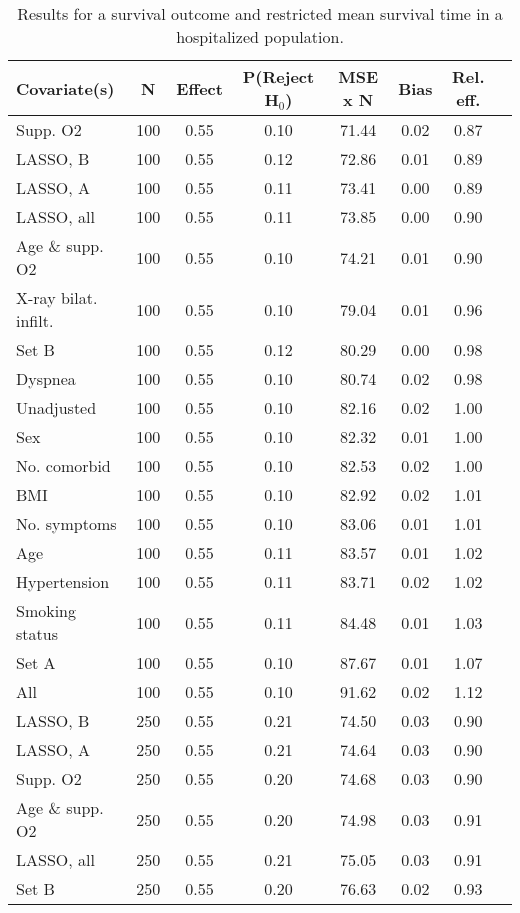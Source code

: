 \documentclass{article}
\begin{document}
{\tabcolsep=6pt  %
\begin{longtable}{lccccccc}
\caption{Results for a survival outcome and restricted mean survival time in a hospitalized population.}\label{tab2}\\
Covariate(s) & N & Effect & P(Reject H$_0$) & MSE x N & Bias & Rel. eff.\\ \midrule
Supp. O2 & 100 & 0.55 & 0.10 & 71.44 & 0.02 & 0.87\\
LASSO, B & 100 & 0.55 & 0.12 & 72.86 & 0.01 & 0.89\\
LASSO, A & 100 & 0.55 & 0.11 & 73.41 & 0.00 & 0.89\\
LASSO, all & 100 & 0.55 & 0.11 & 73.85 & 0.00 & 0.90\\
Age \& supp. O2 & 100 & 0.55 & 0.10 & 74.21 & 0.01 & 0.90\\
X-ray bilat. infilt. & 100 & 0.55 & 0.10 & 79.04 & 0.01 & 0.96\\
Set B & 100 & 0.55 & 0.12 & 80.29 & 0.00 & 0.98\\
Dyspnea & 100 & 0.55 & 0.10 & 80.74 & 0.02 & 0.98\\
Unadjusted & 100 & 0.55 & 0.10 & 82.16 & 0.02 & 1.00\\
Sex & 100 & 0.55 & 0.10 & 82.32 & 0.01 & 1.00\\
No. comorbid & 100 & 0.55 & 0.10 & 82.53 & 0.02 & 1.00\\
BMI & 100 & 0.55 & 0.10 & 82.92 & 0.02 & 1.01\\
No. symptoms & 100 & 0.55 & 0.10 & 83.06 & 0.01 & 1.01\\
Age & 100 & 0.55 & 0.11 & 83.57 & 0.01 & 1.02\\
Hypertension & 100 & 0.55 & 0.11 & 83.71 & 0.02 & 1.02\\
Smoking status & 100 & 0.55 & 0.11 & 84.48 & 0.01 & 1.03\\
Set A & 100 & 0.55 & 0.10 & 87.67 & 0.01 & 1.07\\
All & 100 & 0.55 & 0.10 & 91.62 & 0.02 & 1.12\\ \midrule
LASSO, B & 250 & 0.55 & 0.21 & 74.50 & 0.03 & 0.90\\
LASSO, A & 250 & 0.55 & 0.21 & 74.64 & 0.03 & 0.90\\
Supp. O2 & 250 & 0.55 & 0.20 & 74.68 & 0.03 & 0.90\\
Age \& supp. O2 & 250 & 0.55 & 0.20 & 74.98 & 0.03 & 0.91\\
LASSO, all & 250 & 0.55 & 0.21 & 75.05 & 0.03 & 0.91\\
Set B & 250 & 0.55 & 0.20 & 76.63 & 0.02 & 0.93\\

\end{longtable}}
\end{document}

